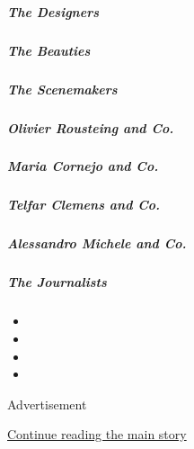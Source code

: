 \hypertarget{the-designers}{%
\subparagraph{The Designers}\label{the-designers}}

\href{13tmag-beauties.html}{}

\hypertarget{the-beauties}{%
\subparagraph{The Beauties}\label{the-beauties}}

\href{/interactive/2020/04/13/t-magazine/nyc-downtown-nightlife-party-scene.html}{}

\hypertarget{the-scenemakers}{%
\subparagraph{The Scenemakers}\label{the-scenemakers}}

\href{/interactive/2020/04/13/t-magazine/maria-cornejo-olivier-rousteing-telfar-clemens-alessandro-michele.html\#olivier-rousteing-and-co}{}

\hypertarget{olivier-rousteing-and-co}{%
\subparagraph{Olivier Rousteing and
Co.}\label{olivier-rousteing-and-co}}

\href{/interactive/2020/04/13/t-magazine/maria-cornejo-olivier-rousteing-telfar-clemens-alessandro-michele.html\#maria-cornejo-and-co}{}

\hypertarget{maria-cornejo-and-co}{%
\subparagraph{Maria Cornejo and Co.}\label{maria-cornejo-and-co}}

\href{/interactive/2020/04/13/t-magazine/maria-cornejo-olivier-rousteing-telfar-clemens-alessandro-michele.html\#telfar-clemens-and-co}{}

\hypertarget{telfar-clemens-and-co}{%
\subparagraph{Telfar Clemens and Co.}\label{telfar-clemens-and-co}}

\href{/interactive/2020/04/13/t-magazine/maria-cornejo-olivier-rousteing-telfar-clemens-alessandro-michele.html\#alessandro-michele-and-co}{}

\hypertarget{alessandro-michele-and-co}{%
\subparagraph{Alessandro Michele and
Co.}\label{alessandro-michele-and-co}}

\href{/interactive/2020/04/13/t-magazine/foreign-correspondents.html}{}

\hypertarget{the-journalists}{%
\subparagraph{The Journalists}\label{the-journalists}}

\begin{itemize}
\item
\item
\item
\item
\end{itemize}

Advertisement

\protect\hyperlink{after-bottom}{Continue reading the main story}

